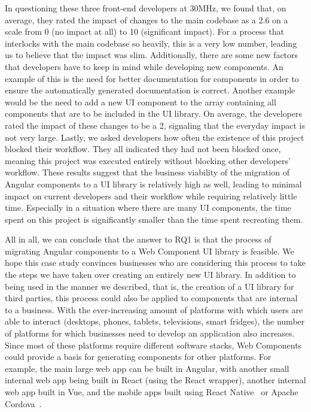 In questioning these three front-end developers at 30MHz, we found that, on average, they rated the impact of changes to the main codebase as a 2.6 on a scale from 0 (no impact at all) to 10 (significant impact). For a process that interlocks with the main codebase so heavily, this is a very low number, leading us to believe that the impact was slim.
Additionally, there are some new factors that developers have to keep in mind while developing new components. An example of this is the need for better documentation for components in order to ensure the automatically generated documentation is correct. Another example would be the need to add a new UI component to the array containing all components that are to be included in the UI library. On average, the developers rated the impact of these changes to be a 2, signaling that the everyday impact is not very large. Lastly, we asked developers how often the existence of this project blocked their workflow. They all indicated they had not been blocked once, meaning this project was executed entirely without blocking other developers' workflow. These results suggest that the business viability of the migration of Angular components to a UI library is relatively high as well, leading to minimal impact on current developers and their workflow while requiring relatively little time. Especially in a situation where there are many UI components, the time spent on this project is significantly smaller than the time spent recreating them.

All in all, we can conclude that the answer to RQ1 is that the process of migrating Angular components to a Web Component UI library is feasible. We hope this case study convinces businesses who are considering this process to take the steps we have taken over creating an entirely new UI library. In addition to being used in the manner we described, that is, the creation of a UI library for third parties, this process could also be applied to components that are internal to a business. With the ever-increasing amount of platforms with which users are able to interact (desktops, phones, tablets, televisions, smart fridges), the number of platforms for which businesses need to develop an application also increases. Since most of these platforms require different software stacks, Web Components could provide a basis for generating components for other platforms. For example, the main large web app can be built in Angular, with another small internal web app being built in React (using the React wrapper), another internal web app built in Vue, and the mobile apps built using React Native~ or Apache Cordova~.

